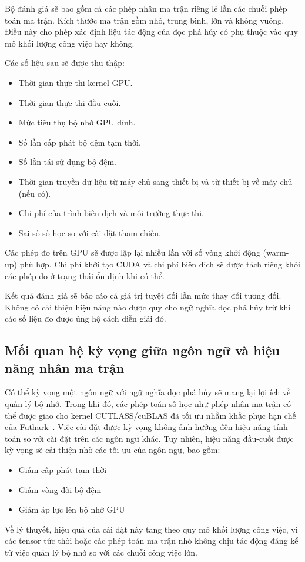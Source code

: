 \documentclass[a4paper]{article}
\begin{document}
	Bộ đánh giá sẽ bao gồm cả các phép nhân ma trận riêng lẻ lẫn các chuỗi phép toán ma trận. Kích thước ma trận gồm nhỏ, trung bình, lớn và không vuông. Điều này cho phép xác định liệu tác động của đọc phá hủy có phụ thuộc vào quy mô khối lượng công việc hay không.
	
	Các số liệu sau sẽ được thu thập:
	
	\begin{itemize}
		\item Thời gian thực thi kernel GPU.
		\item Thời gian thực thi đầu-cuối.
		\item Mức tiêu thụ bộ nhớ GPU đỉnh.
		\item Số lần cấp phát bộ đệm tạm thời.
		\item Số lần tái sử dụng bộ đệm.
		\item Thời gian truyền dữ liệu từ máy chủ sang thiết bị và từ thiết bị về máy chủ (nếu có).
		\item Chi phí của trình biên dịch và môi trường thực thi.
		\item Sai số số học so với cài đặt tham chiếu.
	\end{itemize}
	
	Các phép đo trên GPU sẽ được lặp lại nhiều lần với số vòng khởi động (warm-up) phù hợp. Chi phí khởi tạo CUDA và chi phí biên dịch sẽ được tách riêng khỏi các phép đo ở trạng thái ổn định khi có thể.
	
	Kết quả đánh giá sẽ báo cáo cả giá trị tuyệt đối lẫn mức thay đổi tương đối. Không có cải thiện hiệu năng nào được quy cho ngữ nghĩa đọc phá hủy trừ khi các số liệu đo được ủng hộ cách diễn giải đó.
	


	\subsection{Mối quan hệ kỳ vọng giữa ngôn ngữ và hiệu năng nhân ma trận}
	
	Có thể kỳ vọng một ngôn ngữ với ngữ nghĩa đọc phá hủy sẽ mang lại lợi ích về quản lý bộ nhớ. Trong khi đó, các phép toán số học như phép nhân ma trận có thể được giao cho kernel CUTLASS/cuBLAS đã tối ưu nhằm khắc phục hạn chế của Futhark~\cite{futhark}. Việc cài đặt được kỳ vọng không ảnh hưởng đến hiệu năng tính toán so với cài đặt trên các ngôn ngữ khác. Tuy nhiên, hiệu năng đầu-cuối được kỳ vọng sẽ cải thiện nhờ các tối ưu của ngôn ngữ, bao gồm:
	\begin{itemize} 
		\item Giảm cấp phát tạm thời
		\item Giảm vòng đời bộ đệm
		\item Giảm áp lực lên bộ nhớ GPU
	\end{itemize}
	Về lý thuyết, hiệu quả của cài đặt này tăng theo quy mô khối lượng công việc, vì các tensor tức thời hoặc các phép toán ma trận nhỏ không chịu tác động đáng kể từ việc quản lý bộ nhớ so với các chuỗi công việc lớn.
	
\end{document}
